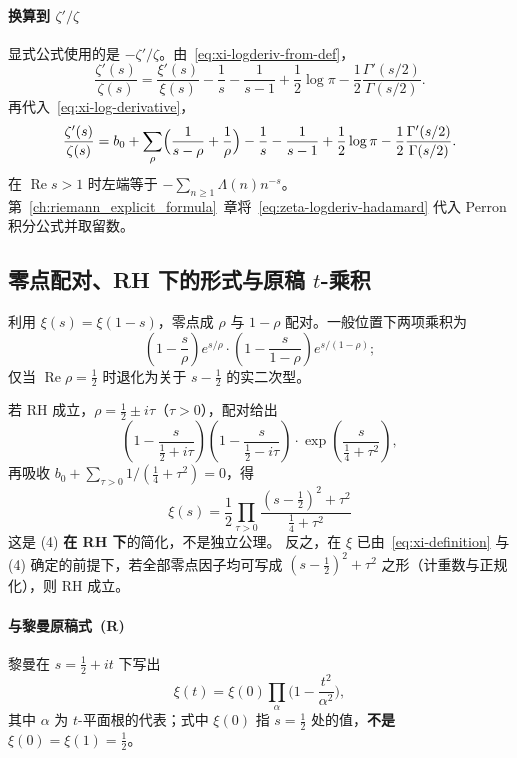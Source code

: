 \paragraph{换算到 $\zeta'/\zeta$}
显式公式使用的是 $-\zeta'/\zeta$。由~\eqref{eq:xi-logderiv-from-def}，
\begin{equation}
  \frac{\zeta'(s)}{\zeta(s)}
  =
  \frac{\xi'(s)}{\xi(s)}
  -\frac{1}{s}-\frac{1}{s-1}
  +\frac12\log\pi
  -\frac12\frac{\Gamma'(s/2)}{\Gamma(s/2)}.
  \label{eq:zeta-from-xi-logderiv}
\end{equation}
再代入~\eqref{eq:xi-log-derivative}，
\begin{equation}
  \frac{\zeta'(s)}{\zeta(s)}
  =
  b_0
  +\sum_{\rho}\Bigl(\frac{1}{s-\rho}+\frac{1}{\rho}\Bigr)
  -\frac{1}{s}-\frac{1}{s-1}
  +\frac12\log\pi
  -\frac12\frac{\Gamma'(s/2)}{\Gamma(s/2)}.
  \label{eq:zeta-logderiv-hadamard}
\end{equation}
在 $\operatorname{Re}s>1$ 时左端等于 $-\sum_{n\ge 1}\Lambda(n)n^{-s}$。
第~\ref{ch:riemann_explicit_formula}~章将~\eqref{eq:zeta-logderiv-hadamard} 代入 Perron 积分公式并取留数。

\subsection{零点配对、RH 下的形式与原稿 $t$-乘积}
\label{sec:hadamard-to-riemann-product}

利用 $\xi(s)=\xi(1-s)$，零点成 $\rho$ 与 $1-\rho$ 配对。一般位置下两项乘积为
\[
\left(1 - \frac{s}{\rho}\right) e^{s/\rho} \cdot \left(1 - \frac{s}{1-\rho}\right) e^{s/(1-\rho)};
\]
仅当 $\operatorname{Re}\rho=\frac12$ 时退化为关于 $s-\frac12$ 的实二次型。

若 RH 成立，$\rho=\frac12\pm i\tau$（$\tau>0$），配对给出
\[
\left(1 - \frac{s}{\frac{1}{2} + i\tau}\right)
\left(1 - \frac{s}{\frac{1}{2} - i\tau}\right)
\cdot
\exp\left(\frac{s}{\frac{1}{4} + \tau^2}\right),
\tag{6}
\]
再吸收 $b_0+\sum_{\tau>0}1/(\tfrac14+\tau^2)=0$，得
\[
\boxed{
\xi(s) = \frac{1}{2} \prod_{\tau > 0}
\frac{(s-\frac{1}{2})^2 + \tau^2}{\frac{1}{4} + \tau^2}
}
\tag{7}
\]
这是 (4) \textbf{在 RH 下}的简化，不是独立公理。
反之，在 $\xi$ 已由~\eqref{eq:xi-definition} 与 (4) 确定的前提下，若全部零点因子均可写成 $(s-\tfrac12)^2+\tau^2$ 之形（计重数与正规化），则 RH 成立。

\paragraph{与黎曼原稿式~(R)}
黎曼在 $s=\frac12+it$ 下写出
\begin{equation}
  \xi(t)=\xi(0)\prod_{\alpha}\Biggl(1-\frac{t^2}{\alpha^2}\Biggr),
  \label{eq:riemann-product-xi-t}
  \tag{R}
\end{equation}
其中 $\alpha$ 为 $t$-平面根的代表；式中 $\xi(0)$ 指 $s=\frac12$ 处的值，\textbf{不是} $\xi(0)=\xi(1)=\frac12$。

